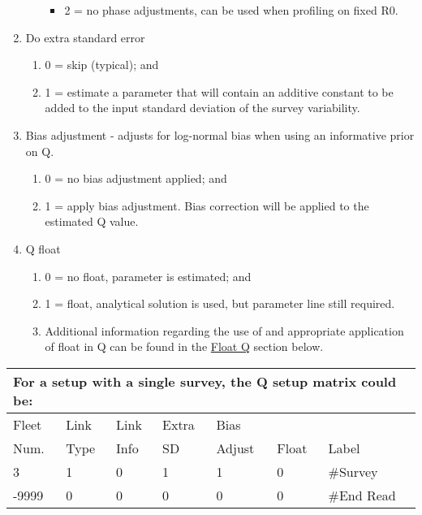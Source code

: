 \begin{enumerate}
\begin{enumerate}
\begin{itemize}
			\item 2 = no phase adjustments, can be used when profiling on fixed R0.
		\end{itemize}
	\end{enumerate}
	\item Do extra standard error
	\begin{enumerate}
		\item 0 = skip (typical); and
		\item 1 = estimate a parameter that will contain an additive constant to be added to the input standard deviation of the survey variability.  
	\end{enumerate}
	\item Bias adjustment - adjusts for log-normal bias when using an informative prior on Q.
	\begin{enumerate}
		\item 0 = no bias adjustment applied; and
		\item 1 = apply bias adjustment. Bias correction will be applied to the estimated Q value.
	\end{enumerate}
	\item Q float
	\begin{enumerate}
		\item 0 = no float, parameter is estimated; and
		\item 1 = float, analytical solution is used, but parameter line still required.
		\item Additional information regarding the use of and appropriate application of float in Q can be found in the \hyperlink{FloatQ}{Float Q} section below.
	\end{enumerate}
\end{enumerate}


\begin{longtable}{p{2cm} p{2cm} p{2cm} p{2cm} p{2cm} p{1.3cm} p{2.3cm}}
	\multicolumn{7}{l}{For a setup with a single survey, the Q setup matrix could be:}\\
	\hline
	Fleet \Tstrut & Link & Link & Extra  & Bias   &   & \\
	Num.          & Type & Info & SD     & Adjust & Float  & Label\Bstrut\\
	\hline
	3 & 1 & 0 & 1 & 1 & 0 & \#Survey  \Tstrut\\
	-9999 & 0 & 0 & 0 & 0 & 0 & \#End Read \Bstrut\\
	\hline
\end{longtable}



